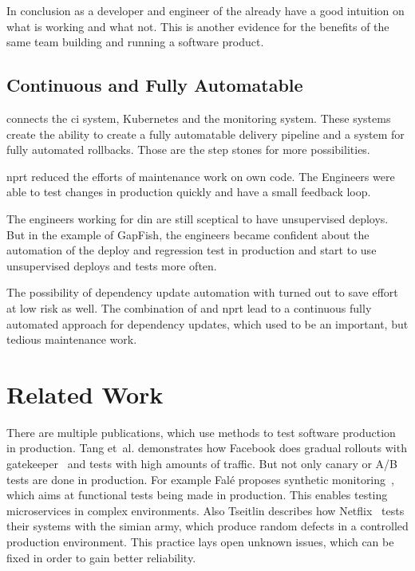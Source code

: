 In conclusion as a developer and engineer of the already have a good intuition on what is
working and what not. This is another evidence for the benefits of the same team building
and running a software product.

\subsection{Continuous and Fully Automatable}

\deployer{} connects the \gls{ci} system, Kubernetes and the monitoring system. These systems
create the ability to create a fully automatable delivery pipeline and a system for fully
automated rollbacks. Those are the step stones for more possibilities.

\gls{nprt} reduced the efforts of maintenance work on own code. The Engineers were able to
test changes in production quickly and have a small feedback loop.

The engineers working for \gls{din} are still sceptical to have unsupervised deploys. But
in the example of GapFish, the engineers became confident about the automation of the
deploy and regression test in production and start to use unsupervised deploys and tests
more often.

The possibility of dependency update automation with \gemupdater{} turned out to save effort
at low risk as well. The combination of \gemupdater{} and \gls{nprt} lead to a continuous
fully automated approach for dependency updates, which used to be an important, but
tedious maintenance work.

\section{Related Work}

There are multiple publications, which use methods to test software production in
production. Tang et~al. demonstrates how Facebook does gradual rollouts with
gatekeeper~\cite{fb_config_management} and tests with high amounts of traffic. But not
only canary or A/B tests are done in production. For example Falé proposes synthetic
monitoring~\cite{synthmonitoring}, which aims at functional tests being made in
production. This enables testing microservices in complex environments. Also Tseitlin
describes how Netflix~\cite{antifragile_org} tests their systems with the simian army,
which produce random defects in a controlled production environment. This practice lays
open unknown issues, which can be fixed in order to gain better reliability.


